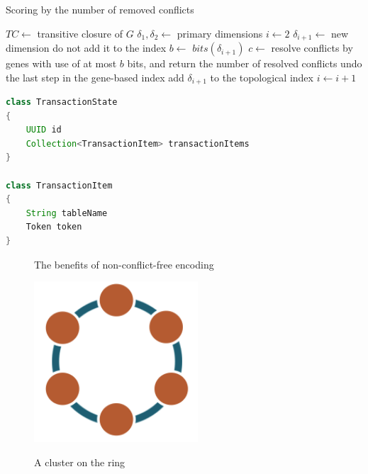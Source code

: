 %
%

\begin{algorithm}
  \caption{Scoring by the number of removed conflicts}
  \label{alg:scoringByNumOfRemovedConflicts}
  \begin{algorithmic}
    \State $TC \gets$ transitive closure of $G$
    \State $\delta_1, \delta_2 \gets$ primary dimensions
    \State $i \gets 2$
      \State $\delta_{i+1} \gets$ new dimension \Comment do not add it to the index
      \State $b \gets$ $bits(\delta_{i+1})$
      \State $c \gets$ resolve conflicts by genes with use of at most $b$ bits, and return the number of resolved
      conflicts
        \State undo the last step in the gene-based index
        \State add $\delta_{i+1}$ to the topological index
        \State $i \gets i+1$
      \EndIf
    \EndWhile   
  \end{algorithmic}
\end{algorithm}


\begin{lstlisting}[language=Java,style=outcode,label={lst:txState},caption={Transaction State data structure}]
class TransactionState
{
    UUID id
    Collection<TransactionItem> transactionItems    
}

class TransactionItem
{
    String tableName
    Token token
}
\end{lstlisting}

\begin{figure}[h]
  \centering
  \caption{The benefits of non-conflict-free encoding}
  \label{fig:compressionBenefits}
\end{figure}

\begin{figure}[h]
  \centering
  \label{fig:archClusterA}\includegraphics[height=60mm]{images/cassandra-ring.png}\hspace{10mm}
  \label{fig:archCluster}
  \caption{A cluster on the ring}
\end{figure}
